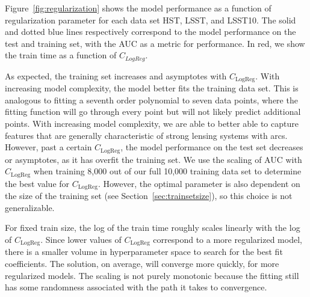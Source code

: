 \documentclass{emulateapj}
\begin{document}
Figure~\ref{fig:regularization} shows the model performance as a
function of regularization parameter for each data set HST, LSST, and
LSST10.  The solid and dotted blue lines respectively correspond to
the model performance on the test and training set, with the AUC as a
metric for performance.  In red, we show the train time as a function
of $C_{LogReg}$.

As expected, the training set increases and asymptotes with
$C_\text{LogReg}$.  With increasing model complexity, the model better
fits the training data set.  This is analogous to fitting a seventh
order polynomial to seven data points, where the fitting function will
go through every point but will not likely predict additional points.
With increasing model complexity, we are able to better able to
capture features that are generally characteristic of strong lensing
systems with arcs. However, past a certain $C_\text{LogReg}$, the
model performance on the test set decreases or asymptotes, as it has
overfit the training set.  We use the scaling of AUC with
$C_\text{LogReg}$ when training 8,000 out of our full 10,000 training
data set to determine the best value for $C_\text{LogReg}$.  However,
the optimal parameter is also dependent on the size of the training
set (see Section~\ref{sec:trainsetsize}), so this choice is not
generalizable.

For fixed train size, the log of the train time roughly scales
linearly with the log of $C_\text{LogReg}$.  Since lower values of
$C_\text{LogReg}$ correspond to a more regularized model, there is a
smaller volume in hyperparameter space to search for the best fit
coefficients.  The solution, on average, will converge more quickly,
for more regularized models.  The scaling is not purely monotonic
because the fitting still has some randomness associated with the path
it takes to convergence.
\end{document}
